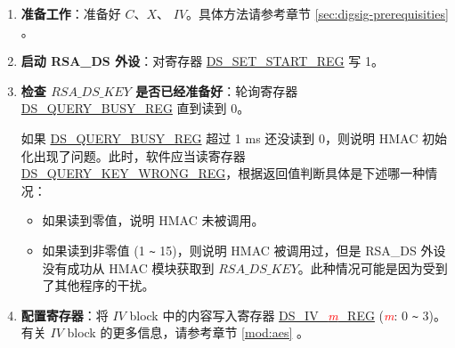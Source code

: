 \documentclass[main\_\_CN.tex]{subfiles}
\begin{document}
\begin{enumerate}

    \item {\bfseries 准备工作}：准备好 \begin{math}C\end{math}、\begin{math}X\end{math}、 \begin{math}IV\end{math}。具体方法请参考章节 \ref{sec:digsig-prerequisities} 。

    \item {\bfseries 启动 RSA\_DS 外设}：对寄存器 \hyperref[regdesc:DSSETSTARTREG]{DS\_SET\_START\_REG} 写 1。

    \item {\bfseries 检查 \begin{math}RSA\_DS\_KEY\end{math} 是否已经准备好}：轮询寄存器 \hyperref[regdesc:DSQUERYBUSYREG]{DS\_QUERY\_BUSY\_REG} 直到读到 0。

    如果 \hyperref[regdesc:DSQUERYBUSYREG]{DS\_QUERY\_BUSY\_REG} 超过 1 ms 还没读到 0，则说明 HMAC 初始化出现了问题。此时，软件应当读寄存器 \hyperref[regdesc:DSQUERYKEYWRONGREG]{DS\_QUERY\_KEY\_WRONG\_REG}，根据返回值判断具体是下述哪一种情况：
    \begin{itemize}

        \item 如果读到零值，说明 HMAC 未被调用。

        \item 如果读到非零值 (1 \verb+~+ 15)，则说明 HMAC 被调用过，但是 RSA\_DS 外设没有成功从 HMAC 模块获取到 \begin{math}RSA\_DS\_KEY\end{math}。此种情况可能是因为受到了其他程序的干扰。

    \end{itemize}

    \item {\bfseries 配置寄存器}：将 \begin{math}IV\end{math} block 中的内容写入寄存器 \hyperref[regdesc:DSIVREG]{DS\_IV\_\textcolor{red}{\it{m}}\_REG} (\textcolor{red}{\it{m}}: 0 \verb+~+ 3)。有关 \begin{math}IV\end{math} block 的更多信息，请参考章节 \ref{mod:aes} \textit{}。


\end{enumerate}
\end{document}
